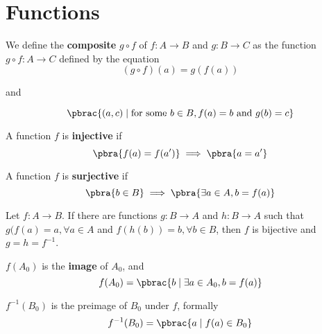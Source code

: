 \section{Functions}

\begin{definition}
  We define the \textbf{composite} $g \circ f$ of $f : A \to B$ and $g : B \to C$ as the function $g \circ f : A \to C$ defined by the equation
  \begin{equation}
    (g \circ f)(a) = g(f(a))
  \end{equation}

  and

  \begin{equation}
    \pbrac{(a, c) \mid \text{for some } b \in B, f(a) = b \text{ and } g(b) = c}
  \end{equation}
\end{definition}

\begin{definition}
  A function $f$ is \textbf{injective} if
  \begin{equation}
    \pbra{
      f(a) = f(a')
    } \implies \pbra{
      a = a'
    }
  \end{equation}
\end{definition}

\begin{definition}
  A function $f$ is \textbf{surjective} if
  \begin{equation}
    \pbra{b \in B} \implies \pbra{
      \exists a \in A, b = f(a)
    }
  \end{equation}
\end{definition}

\begin{lemma}
  Let $f : A \to B$. If there are functions $g : B \to A$ and $h : B \to A$ such
  that $g(f(a) = a, \forall a \in A$ and $f(h(b)) = b, \forall b \in B$, then
  $f$ is bijective and $g = h = f^{-1}$.
\end{lemma}

\begin{definition}
  $f(A_0)$ is the \textbf{image} of $A_0$, and
  \begin{equation}
    f(A_0) = \pbrac{
      b \mid \exists a \in A_0, b = f(a)
    }
  \end{equation}
\end{definition}

\begin{definition}
  $f^{-1}(B_0)$ is the preimage of $B_0$ under $f$, formally
  \begin{equation}
    f^{-1}(B_0) = \pbrac{
      a \mid f(a) \in B_0
    }
  \end{equation}
\end{definition}

